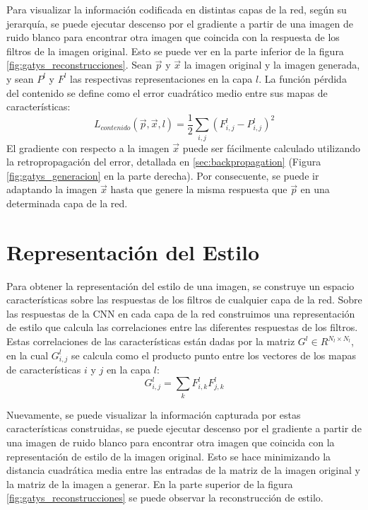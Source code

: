 \documentclass[a4paper,11pt,spanish]{book}
\begin{document}
      Para visualizar la información codificada en distintas capas de la red, según su jerarquía, se puede ejecutar descenso por el gradiente a partir de una imagen de ruido blanco
      para encontrar otra imagen que coincida con la respuesta de los filtros de la imagen original. Esto se puede ver en la 
      parte inferior de la figura \ref{fig:gatys_reconstrucciones}.
      Sean $\overrightarrow{p}$ y $\overrightarrow{x}$ la imagen original y la imagen generada, y sean $P^l$ y $F^l$ las respectivas representaciones en la capa $l$.
      La función pérdida del contenido se define como el error cuadrático medio entre sus mapas de características:
      \begin{equation} \label{eq:perdida_contenido}
       L_{contenido}(\overrightarrow{p},\overrightarrow{x}, l) = \frac{1}{2} \sum_{i,j} (F_{i,j}^l - P_{i,j}^l)^2
      \end{equation}
      El gradiente con respecto a la imagen $\overrightarrow{x}$ puede ser fácilmente calculado utilizando la retropropagación del error, detallada en \ref{sec:backpropagation} (Figura \ref{fig:gatys_generacion} en la parte derecha).
      Por consecuente, se puede ir adaptando la imagen $\overrightarrow{x}$ hasta que genere la misma respuesta que $\overrightarrow{p}$ en una determinada capa de la red.

      
    \section{Representación del Estilo} \label{sec:estilo}
      Para obtener la representación del estilo de una imagen, se construye un espacio características sobre las respuestas de los filtros de cualquier capa de la red. 
      Sobre las respuestas de la CNN en cada capa de la red construimos una representación de estilo que calcula las correlaciones entre las diferentes respuestas de los filtros.
      Estas correlaciones de las características están dadas por la matriz $G^l \in R^{N_l \times N_l}$, en la cual $G_{i,j}^l$ se calcula como el producto punto entre los vectores
      de los mapas de características $i$ y $j$ en la capa $l$:
      \begin{equation}
	G_{i,j}^l = \sum_{k} F_{i,k}^l F_{j,k}^l
      \end{equation}

      Nuevamente, se puede visualizar la información capturada por estas características construidas, se puede ejecutar descenso por el gradiente a partir de una imagen de ruido blanco
      para encontrar otra imagen que coincida con la representación de estilo de la imagen original. 
      Esto se hace minimizando la distancia cuadrática media entre las entradas de la matriz de la imagen
      original y la matriz de la imagen a generar.
      En la parte superior de la figura \ref{fig:gatys_reconstrucciones} se puede observar la reconstrucción de estilo.
      
\end{document}

